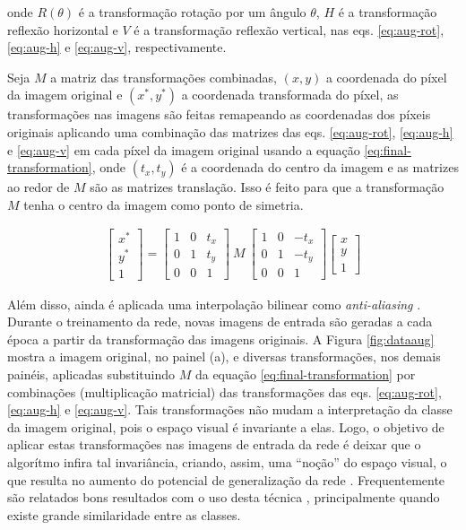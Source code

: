 onde $R(\theta)$ é a transformação rotação por um ângulo $\theta$,
$H$ é a transformação reflexão horizontal e $V$ é a transformação reflexão vertical, nas eqs. \eqref{eq:aug-rot}, \eqref{eq:aug-h} e \eqref{eq:aug-v}, respectivamente.

Seja $M$ a matriz das transformações combinadas, $(x, y)$ a coordenada do píxel da imagem original e $(x^*, y^*)$ a coordenada transformada do píxel, as transformações nas imagens são feitas remapeando as coordenadas dos píxeis originais aplicando uma combinação das matrizes das eqs. \eqref{eq:aug-rot}, \eqref{eq:aug-h} e \eqref{eq:aug-v} em cada píxel da imagem original usando a equação \eqref{eq:final-transformation}, onde $(t_x, t_y)$ é a coordenada do centro da imagem e as matrizes ao redor de $M$ são as matrizes translação. Isso é feito para que a transformação $M$ tenha o centro da imagem como ponto de simetria.

\begin{align} \label{eq:final-transformation}
  \begin{bmatrix}
    x^* \\
    y^* \\
    1
  \end{bmatrix}
  =
  \begin{bmatrix}
    1 & 0 & t_x \\
    0 & 1 & t_y \\
    0 & 0 & 1
  \end{bmatrix}
  \ M\
  \begin{bmatrix}
    1 & 0 & -t_x \\
    0 & 1 & -t_y \\
    0 & 0 & 1
  \end{bmatrix}
  \begin{bmatrix}
    x \\
    y \\
    1
  \end{bmatrix}
\end{align}

Além disso, ainda é aplicada uma interpolação bilinear como \emph{anti-aliasing} \cite{aliasing,bilinear}. Durante o treinamento da rede, novas imagens de entrada são geradas a cada época a partir da transformação das imagens originais. A Figura \ref{fig:dataaug} mostra a imagem original, no painel (a), e diversas transformações, nos demais painéis, aplicadas substituindo $M$ da equação \eqref{eq:final-transformation} por combinações (multiplicação matricial) das transformações das eqs. \eqref{eq:aug-rot}, \eqref{eq:aug-h} e \eqref{eq:aug-v}. Tais transformações não mudam a interpretação da classe da imagem original, pois o espaço visual é invariante a elas. Logo, o objetivo de aplicar estas transformações nas imagens de entrada da rede é deixar que o algorítmo infira tal invariância, criando, assim, uma ``noção'' do espaço visual, o que resulta no aumento do potencial de generalização da rede \cite{Simard2003,CholletBook}. Frequentemente são relatados bons resultados com o uso desta técnica \cite{EfficientNetEx01,EfficientNetEx02,CNNEx04}, principalmente quando existe grande similaridade entre as classes.






